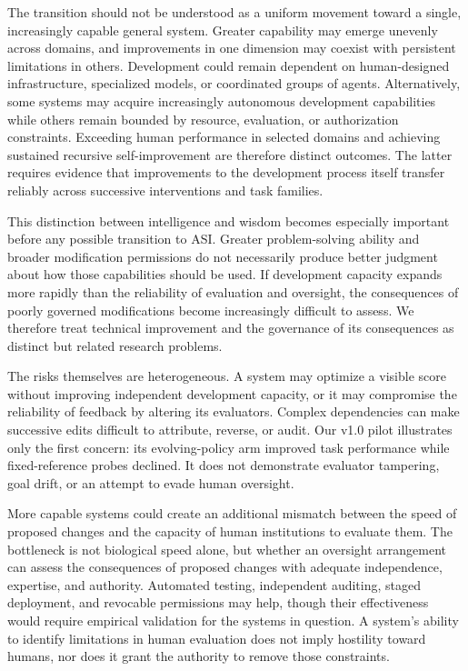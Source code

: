 \documentclass[11pt,a4paper]{article}
\begin{document}
The transition should not be understood as a uniform movement toward a single, increasingly capable general system. Greater capability may emerge unevenly across domains, and improvements in one dimension may coexist with persistent limitations in others. Development could remain dependent on human-designed infrastructure, specialized models, or coordinated groups of agents. Alternatively, some systems may acquire increasingly autonomous development capabilities while others remain bounded by resource, evaluation, or authorization constraints. Exceeding human performance in selected domains and achieving sustained recursive self-improvement are therefore distinct outcomes. The latter requires evidence that improvements to the development process itself transfer reliably across successive interventions and task families.

This distinction between intelligence and wisdom becomes especially important before any possible transition to ASI. Greater problem-solving ability and broader modification permissions do not necessarily produce better judgment about how those capabilities should be used. If development capacity expands more rapidly than the reliability of evaluation and oversight, the consequences of poorly governed modifications become increasingly difficult to assess. We therefore treat technical improvement and the governance of its consequences as distinct but related research problems.

The risks themselves are heterogeneous. A system may optimize a visible score without improving independent development capacity, or it may compromise the reliability of feedback by altering its evaluators. Complex dependencies can make successive edits difficult to attribute, reverse, or audit. Our v1.0 pilot illustrates only the first concern: its evolving-policy arm improved task performance while fixed-reference probes declined. It does not demonstrate evaluator tampering, goal drift, or an attempt to evade human oversight.

More capable systems could create an additional mismatch between the speed of proposed changes and the capacity of human institutions to evaluate them. The bottleneck is not biological speed alone, but whether an oversight arrangement can assess the consequences of proposed changes with adequate independence, expertise, and authority. Automated testing, independent auditing, staged deployment, and revocable permissions may help, though their effectiveness would require empirical validation for the systems in question. A system's ability to identify limitations in human evaluation does not imply hostility toward humans, nor does it grant the authority to remove those constraints.
\end{document}

